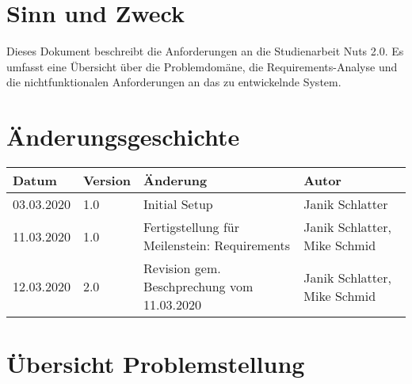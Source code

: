 \documentclass[
	ngerman,
	toc=listof, %
	toc=bibliography, %
	footnotes=multiple, %
	parskip=half, %
	numbers=noendperiod %
]{scrartcl}
\newcommand{\vorlagenOrdner}{../../99_Vorlagen} %
\begin{document}
\thispagestyle{plain}

\cleardoublepage


\section{Sinn und Zweck}
Dieses Dokument beschreibt die Anforderungen an die Studienarbeit Nuts 2.0.
Es umfasst eine Übersicht über die Problemdomäne, die Requirements-Analyse und die nichtfunktionalen Anforderungen an das zu entwickelnde System.

\section*{Änderungsgeschichte}
\begin{tabularx}{\textwidth}{llXl}
	\toprule
	Datum & Version & Änderung & Autor \\
	\midrule
	03.03.2020 & 1.0 & Initial Setup & Janik Schlatter \\
	11.03.2020 & 1.0 & Fertigstellung für Meilenstein: Requirements & Janik Schlatter, Mike Schmid \\
	12.03.2020 & 2.0 & Revision gem. Beschprechung vom 11.03.2020 & Janik Schlatter, Mike Schmid \\
	\bottomrule
\end{tabularx}
\cleardoublepage

{}
\tableofcontents
\cleardoublepage

\let\stdsection\section
\renewcommand\section{\clearpage\stdsection}

\section{Übersicht Problemstellung}
\end{document}
